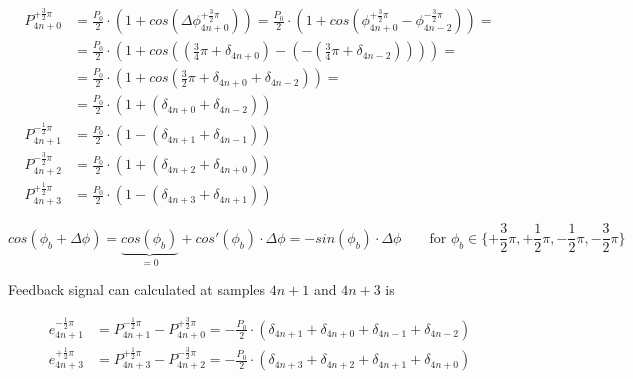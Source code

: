\documentclass{article}
\begin{document}
\begin{equation}
    \begin{split}
        P_{4n+0}^{+\frac{3}{2}\pi} & = \frac{P_0}{2} \cdot (1 + cos(\Delta\phi_{4n+0}^{+\frac{3}{2}\pi})) = \frac{P_0}{2} \cdot (1 + cos(\phi_{4n+0}^{+\frac{3}{2}\pi} - \phi_{4n-2}^{-\frac{3}{2}\pi})) = \\
                                   & = \frac{P_0}{2} \cdot (1 + cos((\frac{3}{4}\pi + \delta_{4n+0}) - (-(\frac{3}{4}\pi + \delta_{4n-2})))) =                                                             \\
                                   & = \frac{P_0}{2} \cdot (1 + cos(\frac{3}{2}\pi + \delta_{4n+0} + \delta_{4n-2})) =                                                                                     \\
                                   & = \frac{P_0}{2} \cdot (1 + (\delta_{4n+0} + \delta_{4n-2}))                                                                                                           \\
        P_{4n+1}^{-\frac{1}{2}\pi} & = \frac{P_0}{2} \cdot (1 - (\delta_{4n+1} + \delta_{4n-1}))                                                                                                           \\
        P_{4n+2}^{-\frac{3}{2}\pi} & = \frac{P_0}{2} \cdot (1 + (\delta_{4n+2} + \delta_{4n+0}))                                                                                                           \\
        P_{4n+3}^{+\frac{1}{2}\pi} & = \frac{P_0}{2} \cdot (1 - (\delta_{4n+3} + \delta_{4n+1}))
    \end{split}
    \label{eq:incident_power}
\end{equation}

\begin{equation}
    cos(\phi_{b} + \Delta\phi) = \underbrace{cos(\phi_{b})}_{=0} + cos'(\phi_{b}) \cdot \Delta\phi = -sin(\phi_{b}) \cdot \Delta\phi \qquad \text{for } \phi_{b} \in \{+\frac{3}{2}\pi, +\frac{1}{2}\pi, -\frac{1}{2}\pi, -\frac{3}{2}\pi\}
    \label{eq:cosine_linearization}
\end{equation}

\noindent
Feedback signal can calculated at samples $4n+1$ and $4n+3$ is

\begin{equation}
    \begin{split}
        e_{4n+1}^{-\frac{1}{2}\pi} & = P_{4n+1}^{-\frac{1}{2}\pi} - P_{4n+0}^{+\frac{3}{2}\pi} = -\frac{P_0}{2} \cdot (\delta_{4n+1} + \delta_{4n+0} + \delta_{4n-1} + \delta_{4n-2}) \\
        e_{4n+3}^{+\frac{1}{2}\pi} & = P_{4n+3}^{+\frac{1}{2}\pi} - P_{4n+2}^{-\frac{3}{2}\pi} = -\frac{P_0}{2} \cdot (\delta_{4n+3} + \delta_{4n+2} + \delta_{4n+1} + \delta_{4n+0}) \\
    \end{split}
    \label{eq:difference}
\end{equation}
\end{document}
